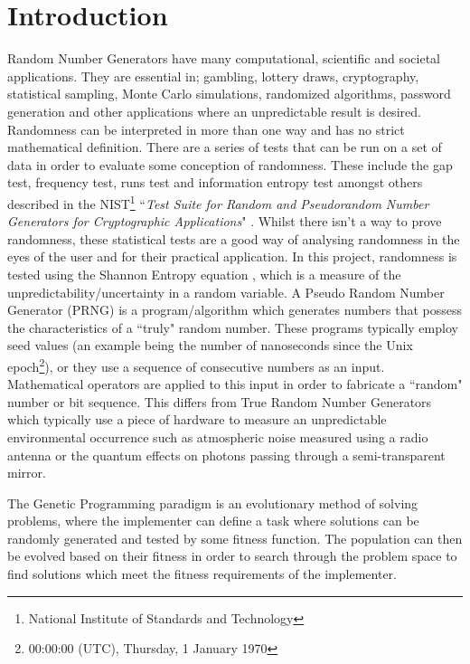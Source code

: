 \documentclass[a4paper,10.5pt]{article}
\begin{document}
\section{Introduction}
Random Number Generators have many computational, scientific and societal applications. They are essential in; gambling, lottery draws, cryptography, statistical sampling, Monte Carlo simulations, randomized algorithms, password generation and other applications where an unpredictable result is desired. Randomness can be interpreted in more than one way and has no strict mathematical definition. There are a series of tests that can be run on a set of data in order to evaluate some conception of randomness. These include the gap test, frequency test, runs test and information entropy test amongst others described in the NIST\footnote{National Institute of Standards and Technology} ``\emph{Test Suite for Random and Pseudorandom Number Generators for Cryptographic Applications}" \cite{nist}. Whilst there isn't a way to prove randomness, these statistical tests are a good way of analysing randomness in the eyes of the user and for their practical application. In this project, randomness is tested using the Shannon Entropy equation \cite[p.2]{kozarng}, which is a measure of the unpredictability/uncertainty in a random variable.
A Pseudo Random Number Generator (PRNG) is a program/algorithm which generates numbers that possess the characteristics of a ``truly" random number. These programs typically employ seed values (an example being the number of nanoseconds since the Unix epoch\footnote{00:00:00 (UTC), Thursday, 1 January 1970}), or they use a sequence of consecutive numbers as an input. Mathematical operators are applied to this input in order to fabricate a ``random" number or bit sequence. This differs from True Random Number Generators which typically use a piece of hardware to measure an unpredictable environmental occurrence such as atmospheric noise measured using a radio antenna \cite{randomorg} or the quantum effects on photons passing through a semi-transparent mirror\cite{quant}.

The Genetic Programming paradigm is an evolutionary method of solving problems, where the implementer can define a task where solutions can be randomly generated and tested by some fitness function. The population can then be evolved based on their fitness in order to search through the problem space to find solutions which meet the fitness requirements of the implementer. 
\end{document}
